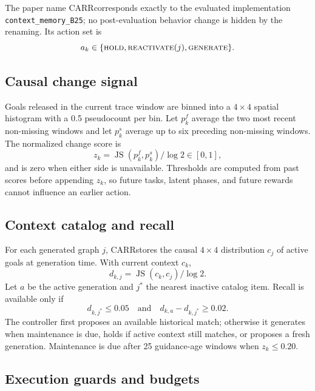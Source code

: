 \documentclass[sigconf,anonymous,review]{acmart}
\newcommand{\carr}{\textsc{CARR}}
\begin{document}
The paper name \carr corresponds exactly to the evaluated implementation
\texttt{context\_memory\_B25}; no post-evaluation behavior change is hidden by
the renaming. Its action set is
\begin{equation}
 a_k\in\{\textsc{hold},\textsc{reactivate}(j),\textsc{generate}\}.
\end{equation}

\subsection{Causal change signal}

Goals released in the current trace window are binned into a $4\times4$
spatial histogram with a 0.5 pseudocount per bin. Let $p_k^f$ average the two
most recent non-missing windows and let $p_k^s$ average up to six preceding
non-missing windows. The normalized change score is
\begin{equation}
 z_k=\operatorname{JS}(p_k^f,p_k^s)/\log 2\in[0,1],
\end{equation}
and is zero when either side is unavailable. Thresholds are computed from
past scores before appending $z_k$, so future tasks, latent phases, and future
rewards cannot influence an earlier action.

\subsection{Context catalog and recall}

For each generated graph $j$, \carr stores the causal $4\times4$ distribution
$c_j$ of active goals at generation time. With current context $c_k$,
\begin{equation}
 d_{k,j}=\operatorname{JS}(c_k,c_j)/\log 2.
\end{equation}
Let $a$ be the active generation and $j^*$ the nearest inactive catalog item.
Recall is available only if
\begin{equation}
 d_{k,j^*}\leq0.05
 \quad\text{and}\quad
 d_{k,a}-d_{k,j^*}\geq0.02.
\end{equation}
The controller first proposes an available historical match; otherwise it
generates when maintenance is due, holds if active context still matches, or
proposes a fresh generation. Maintenance is due after 25 guidance-age windows
when $z_k\leq0.20$.

\subsection{Execution guards and budgets}
\end{document}

